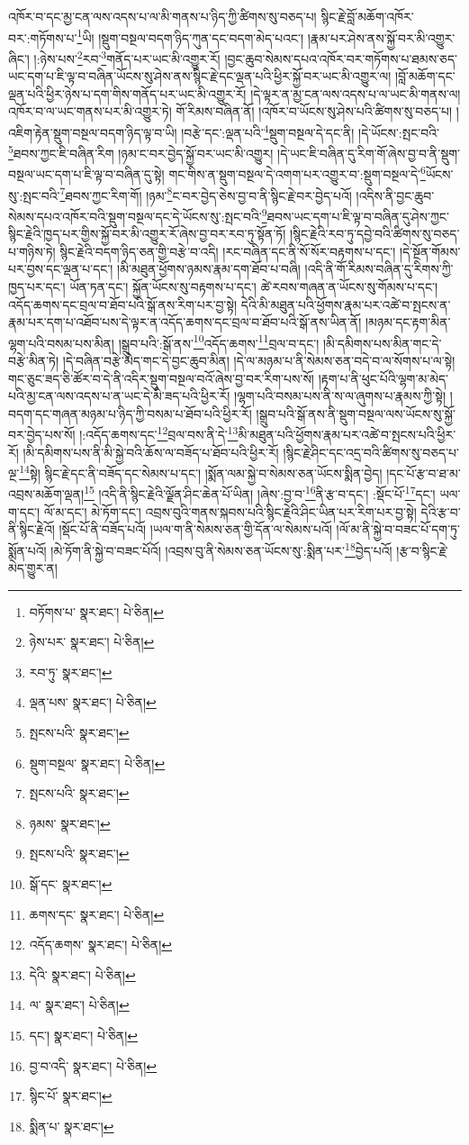 འཁོར་བ་དང་མྱ་ངན་ལས་འདས་པ་ལ་མི་གནས་པ་ཉིད་ཀྱི་ཚིགས་སུ་བཅད་པ། སྙིང་རྗེ་བློ་མཆོག་འཁོར་བར་:གཏོགས་པ་\footnote{བཏོགས་པ་  སྣར་ཐང་།  པེ་ཅིན། }ཡི། །སྡུག་བསྔལ་བདག་ཉིད་ཀུན་དང་བདག་མེད་པའང་། །རྣམ་པར་ཤེས་ནས་སྐྱོ་བར་མི་འགྱུར་ཞིང་། །:ཉེས་པས་\footnote{ཉེས་པར་  སྣར་ཐང་།  པེ་ཅིན། }རབ་\footnote{རབ་ཏུ་  སྣར་ཐང་། }གནོད་པར་ཡང་མི་འགྱུར་རོ། །བྱང་ཆུབ་སེམས་དཔའ་འཁོར་བར་གཏོགས་པ་ཐམས་ཅད་ཡང་དག་པ་ཇི་ལྟ་བ་བཞིན་ཡོངས་སུ་ཤེས་ནས་སྙིང་རྗེ་དང་ལྡན་པའི་ཕྱིར་སྐྱོ་བར་ཡང་མི་འགྱུར་ལ། །བློ་མཆོག་དང་ལྡན་པའི་ཕྱིར་ཉེས་པ་དག་གིས་གནོད་པར་ཡང་མི་འགྱུར་རོ། །དེ་ལྟར་ན་མྱ་ངན་ལས་འདས་པ་ལ་ཡང་མི་གནས་ལ། འཁོར་བ་ལ་ཡང་གནས་པར་མི་འགྱུར་ཏེ། གོ་རིམས་བཞིན་ནོ། །འཁོར་བ་ཡོངས་སུ་ཤེས་པའི་ཚིགས་སུ་བཅད་པ། །འཇིག་རྟེན་སྡུག་བསྔལ་བདག་ཉིད་ལྟ་བ་ཡི། །བརྩེ་དང་:ལྡན་པའི་\footnote{ལྡན་པས་  སྣར་ཐང་།  པེ་ཅིན། }སྡུག་བསྔལ་དེ་དང་ནི། །དེ་ཡོངས་:སྤང་བའི་\footnote{སྤངས་པའི་  སྣར་ཐང་། }ཐབས་ཀྱང་ཇི་བཞིན་རིག །ཉམ་ང་བར་བྱེད་སྐྱོ་བར་ཡང་མི་འགྱུར། །དེ་ཡང་ཇི་བཞིན་དུ་རིག་གོ་ཞེས་བྱ་བ་ནི་སྡུག་བསྔལ་ཡང་དག་པ་ཇི་ལྟ་བ་བཞིན་དུ་སྟེ། གང་གིས་ན་སྡུག་བསྔལ་དེ་འགག་པར་འགྱུར་བ་:སྡུག་བསྔལ་དེ་\footnote{སྡུག་བསྔལ་  སྣར་ཐང་།  པེ་ཅིན། }ཡོངས་སུ་:སྤང་བའི་\footnote{སྤངས་པའི་  སྣར་ཐང་། }ཐབས་ཀྱང་རིག་གོ། །ཉམ་\footnote{ཉམས་  སྣར་ཐང་། }ང་བར་བྱེད་ཅེས་བྱ་བ་ནི་སྙིང་རྗེ་བར་བྱེད་པའོ། །འདིས་ནི་བྱང་ཆུབ་སེམས་དཔའ་འཁོར་བའི་སྡུག་བསྔལ་དང་དེ་ཡོངས་སུ་:སྤང་བའི་\footnote{སྤངས་པའི་  སྣར་ཐང་། }ཐབས་ཡང་དག་པ་ཇི་ལྟ་བ་བཞིན་དུ་ཤེས་ཀྱང་སྙིང་རྗེའི་ཁྱད་པར་གྱིས་སྐྱོ་བར་མི་འགྱུར་རོ་ཞེས་བྱ་བར་རབ་ཏུ་སྟོན་ཏོ། །སྙིང་རྗེའི་རབ་ཏུ་དབྱེ་བའི་ཚིགས་སུ་བཅད་པ་གཉིས་ཏེ། སྙིང་རྗེའི་བདག་ཉིད་ཅན་གྱི་བརྩེ་བ་འདི། །རང་བཞིན་དང་ནི་སོ་སོར་བརྟགས་པ་དང་། །དེ་སྔོན་གོམས་པར་བྱས་དང་ལྡན་པ་དང་། །མི་མཐུན་ཕྱོགས་ཉམས་རྣམ་དག་ཐོབ་པ་བཞི། །འདི་ནི་གོ་རིམས་བཞིན་དུ་རིགས་ཀྱི་ཁྱད་པར་དང་། ཡོན་ཏན་དང་། སྐྱོན་ཡོངས་སུ་བརྟགས་པ་དང་། ཚེ་རབས་གཞན་ན་ཡོངས་སུ་གོམས་པ་དང་། འདོད་ཆགས་དང་བྲལ་བ་ཐོབ་པའི་སྒོ་ནས་རིག་པར་བྱ་སྟེ། དེའི་མི་མཐུན་པའི་ཕྱོགས་རྣམ་པར་འཚེ་བ་སྤངས་ན་རྣམ་པར་དག་པ་འཐོབ་པས་དེ་ལྟར་ན་འདོད་ཆགས་དང་བྲལ་བ་ཐོབ་པའི་སྒོ་ནས་ཡིན་ནོ། །མཉམ་དང་རྟག་མིན་ལྷག་པའི་བསམ་པས་མིན། །སྒྲུབ་པའི་:སྒོ་ནས་\footnote{སྒོ་དང་  སྣར་ཐང་། }འདོད་ཆགས་\footnote{ཆགས་དང་  སྣར་ཐང་།  པེ་ཅིན། }བྲལ་བ་དང་། །མི་དམིགས་པས་མིན་གང་དེ་བརྩེ་མིན་ཏེ། །དེ་བཞིན་བརྩེ་མེད་གང་དེ་བྱང་ཆུབ་མིན། །དེ་ལ་མཉམ་པ་ནི་སེམས་ཅན་བདེ་བ་ལ་སོགས་པ་ལ་སྟེ། གང་ཅུང་ཟད་ཅི་ཚོར་བ་དེ་ནི་འདིར་སྡུག་བསྔལ་བའོ་ཞེས་བྱ་བར་རིག་པས་སོ། །རྟག་པ་ནི་ཕུང་པོའི་ལྷག་མ་མེད་པའི་མྱ་ངན་ལས་འདས་པ་ན་ཡང་དེ་མི་ཟད་པའི་ཕྱིར་རོ། །ལྷག་པའི་བསམ་པས་ནི་ས་ལ་ཞུགས་པ་རྣམས་ཀྱི་སྟེ། །བདག་དང་གཞན་མཉམ་པ་ཉིད་ཀྱི་བསམ་པ་ཐོབ་པའི་ཕྱིར་རོ། །སྒྲུབ་པའི་སྒོ་ནས་ནི་སྡུག་བསྔལ་ལས་ཡོངས་སུ་སྐྱོ་བར་བྱེད་པས་སོ། །:འདོད་ཆགས་དང་\footnote{འདོད་ཆགས་  སྣར་ཐང་།  པེ་ཅིན། }བྲལ་བས་ནི་དེ་\footnote{དེའི་  སྣར་ཐང་།  པེ་ཅིན། }མི་མཐུན་པའི་ཕྱོགས་རྣམ་པར་འཚེ་བ་སྤངས་པའི་ཕྱིར་རོ། །མི་དམིགས་པས་ནི་མི་སྐྱེ་བའི་ཆོས་ལ་བཟོད་པ་ཐོབ་པའི་ཕྱིར་རོ། །སྙིང་རྗེ་ཤིང་དང་འདྲ་བའི་ཚིགས་སུ་བཅད་པ་ལྔ་\footnote{ལ་  སྣར་ཐང་།  པེ་ཅིན། }སྟེ། སྙིང་རྗེ་དང་ནི་བཟོད་དང་སེམས་པ་དང་། །སྨོན་ལམ་སྐྱེ་བ་སེམས་ཅན་ཡོངས་སྨིན་བྱེད། །དང་པོ་རྩ་བ་ཐ་མ་འབྲས་མཆོག་ལྡན།\footnote{དང་།  སྣར་ཐང་།  པེ་ཅིན། } །འདི་ནི་སྙིང་རྗེའི་ལྗོན་ཤིང་ཆེན་པོ་ཡིན། །ཞེས་:བྱ་བ་\footnote{བྱ་བ་འདི་  སྣར་ཐང་།  པེ་ཅིན། }ནི་རྩ་བ་དང་། :སྡོང་པོ་\footnote{སྙིང་པོ་  སྣར་ཐང་། }དང་། ཡལ་ག་དང་། ལོ་མ་དང་། མེ་ཏོག་དང་། འབྲས་བུའི་གནས་སྐབས་པའི་སྙིང་རྗེའི་ཤིང་ཡིན་པར་རིག་པར་བྱ་སྟེ། དེའི་རྩ་བ་ནི་སྙིང་རྗེའོ། །སྡོང་པོ་ནི་བཟོད་པའོ། །ཡལ་ག་ནི་སེམས་ཅན་གྱི་དོན་ལ་སེམས་པའོ། །ལོ་མ་ནི་སྐྱེ་བ་བཟང་པོ་དག་ཏུ་སྨོན་པའོ། །མེ་ཏོག་ནི་སྐྱེ་བ་བཟང་པོའོ། །འབྲས་བུ་ནི་སེམས་ཅན་ཡོངས་སུ་:སྨིན་པར་\footnote{སྨིན་པ་  སྣར་ཐང་། }བྱེད་པའོ། །རྩ་བ་སྙིང་རྗེ་མེད་གྱུར་ན། 